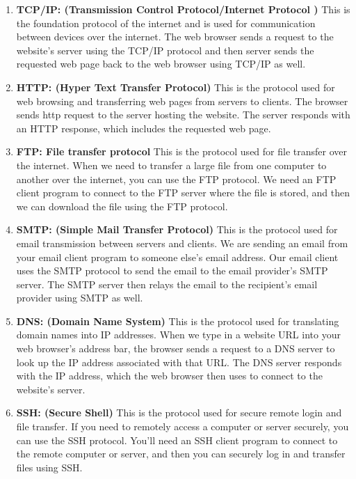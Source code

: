 \documentclass[11pt]{article}
\begin{document}
\begin{enumerate}
    \item \textbf{TCP/IP: (Transmission Control Protocol/Internet Protocol )} This is the foundation protocol of the internet and is used for communication between devices over the internet. The web browser sends a request to the website's server using the TCP/IP protocol and then server sends the requested web page back to the web browser using TCP/IP as well.

    \item \textbf{HTTP: (Hyper Text Transfer Protocol)} This is the protocol used for web browsing and transferring web pages from servers to clients. The browser sends http request to the server hosting the website. The server responds with an HTTP response, which includes the requested web page.
    
    \item \textbf{FTP: File transfer protocol} This is the protocol used for file transfer over the internet.  When we need to transfer a large file from one computer to another over the internet, you can use the FTP protocol. We need an FTP client program to connect to the FTP server where the file is stored, and then we can download the file using the FTP protocol.
    
    \item \textbf{SMTP: (Simple Mail Transfer Protocol)} This is the protocol used for email transmission between servers and clients. We are sending an email from your email client program to someone else's email address. Our email client uses the SMTP protocol to send the email to the email provider's SMTP server. The SMTP server then relays the email to the recipient's email provider using SMTP as well.
    
    \item \textbf{DNS: (Domain Name System)} This is the protocol used for translating domain names into IP addresses. When we type in a website URL into your web browser's address bar, the browser sends a request to a DNS server to look up the IP address associated with that URL. The DNS server responds with the IP address, which the web browser then uses to connect to the website's server.
    
    \item \textbf{SSH: (Secure Shell)} This is the protocol used for secure remote login and file transfer. If you need to remotely access a computer or server securely, you can use the SSH protocol. You'll need an SSH client program to connect to the remote computer or server, and then you can securely log in and transfer files using SSH.
    

\end{enumerate}
\end{document}
